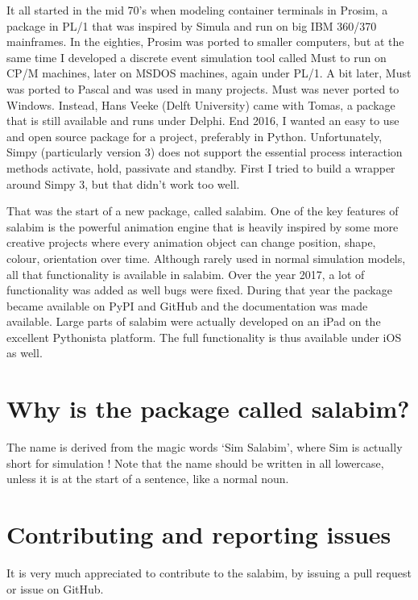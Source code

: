 \documentclass[letterpaper,10pt,english]{sphinxmanual}
\begin{document}
It all started in the mid 70’s when modeling container terminals in Prosim, a package
in PL/1 that was inspired by Simula and run on big IBM 360/370 mainframes. 
In the eighties, Prosim was ported to smaller computers, but at the same time I
developed a discrete event simulation tool called Must to run on CP/M machines, later
on MSDOS machines, again under PL/1. A bit later, Must was ported to Pascal and was
used in many projects. Must was never ported to Windows. Instead, Hans Veeke (Delft University)
came with Tomas, a package that is still available and runs under Delphi. 
End 2016, I wanted an easy to use and open source package for a project, preferably
in Python. Unfortunately, Simpy (particularly version 3) does not support the essential
process interaction methods activate, hold, passivate and standby. First I tried to
build a wrapper around Simpy 3, but that didn’t work too well.

That was the start of a new package, called salabim.
One of the key features of salabim is the powerful animation engine that is heavily
inspired by some more creative projects where every animation object can change position,
shape, colour, orientation over time. Although rarely used in normal simulation models,
all that functionality is available in salabim. 
Over the year 2017, a lot of functionality was added as well bugs were fixed. During that year
the package became available on PyPI and GitHub and the documentation was made available. 
Large parts of salabim were actually developed on an iPad on the excellent Pythonista platform. The full
functionality is thus available under iOS as well.


\section{Why is the package called salabim?}
\label{\detokenize{About:why-is-the-package-called-salabim}}
The name is derived from the magic words ‘Sim Salabim’,
where Sim is actually short for simulation !
Note that the name should be written in all lowercase, unless it is at the start of a sentence, like a
normal noun.


\section{Contributing and reporting issues}
\label{\detokenize{About:contributing-and-reporting-issues}}
It is very much appreciated to contribute to the salabim, by issuing a pull request or issue on GitHub.
\end{document}
